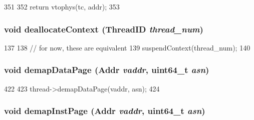 \begin{DoxyCode}
351 {
352     return vtophys(tc, addr);
353 }
\end{DoxyCode}
\hypertarget{classBaseSimpleCPU_a49259982c98a7959f39b77db5069fea0}{
\subsubsection[{deallocateContext}]{\setlength{\rightskip}{0pt plus 5cm}void deallocateContext ({\bf ThreadID} {\em thread\_\-num})}}
\label{classBaseSimpleCPU_a49259982c98a7959f39b77db5069fea0}



\begin{DoxyCode}
137 {
138     // for now, these are equivalent
139     suspendContext(thread_num);
140 }
\end{DoxyCode}
\hypertarget{classBaseSimpleCPU_a26789603cc94992d18f8ddedfff96acf}{
\subsubsection[{demapDataPage}]{\setlength{\rightskip}{0pt plus 5cm}void demapDataPage ({\bf Addr} {\em vaddr}, \/  uint64\_\-t {\em asn})}}
\label{classBaseSimpleCPU_a26789603cc94992d18f8ddedfff96acf}



\begin{DoxyCode}
422     {
423         thread->demapDataPage(vaddr, asn);
424     }
\end{DoxyCode}
\hypertarget{classBaseSimpleCPU_ac8a36d45a839b07f50b73f1eee119615}{
\subsubsection[{demapInstPage}]{\setlength{\rightskip}{0pt plus 5cm}void demapInstPage ({\bf Addr} {\em vaddr}, \/  uint64\_\-t {\em asn})}}
\label{classBaseSimpleCPU_ac8a36d45a839b07f50b73f1eee119615}



